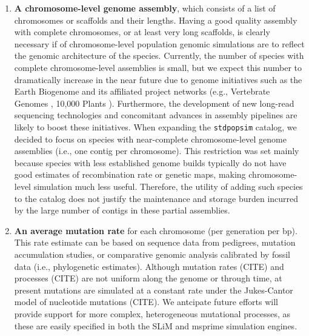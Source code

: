 \documentclass[hidelinks]{article}
\newcommand{\stdpopsim}{\texttt{stdpopsim}\xspace}
\begin{document}
\begin{enumerate}
\def\labelenumi{\arabic{enumi}.}

\item
  \textbf{A chromosome-level genome assembly}, which consists of a list of chromosomes or scaffolds and their lengths. 
  Having a good quality assembly with complete chromosomes, or at least very long scaffolds, 
  is clearly necessary if of chromosome-level population genomic simulations are to reflect the genomic architecture of the species.
  Currently, the number of species with complete chromosome-level assemblies is small,
  but we expect this number to dramatically increase in the near future due to genome initiatives 
  such as the Earth Biogenome \citep{Lewin2022} and its affiliated project networks (e.g.,
  Vertebrate Genomes \citep{Rhie2021}, 10,000 Plants \citep{Cheng2018}).
  Furthermore, the development of new long-read sequencing technologies
  \citep{Amarasinghe2020} and concomitant advances in assembly pipelines
  \citep{Chakraborty2016} are likely to boost these initiatives. 
  When expanding the \stdpopsim catalog, we decided to focus on species with near-complete 
  chromosome-level genome assemblies (i.e., one contig per chromosome).
  This restriction was set mainly because species with less established genome builds 
  typically do not have good estimates of recombination rate or genetic maps, 
  making chromosome-level simulation much less useful. 
  Therefore, the utility of adding such species to the catalog does not justify the 
  maintenance and storage burden incurred by the large number of contigs in these partial assemblies.

\item
  \textbf{An average mutation rate} for each chromosome (per generation per bp).
  This rate estimate can be based on sequence data from pedigrees, mutation accumulation studies, 
  or comparative genomic analysis calibrated by fossil data (i.e., phylogenetic estimates).
  Although mutation rates (CITE) and processes (CITE) are not uniform along the genome or through time,
  at present mutations are simulated at a constant rate under the Jukes-Cantor model of nucleotide mutations (CITE).
  We antcipate future efforts will provide support for more complex, heterogeneous mutational processes,
  as these are easily specified in both the SLiM and msprime simulation engines.


\end{enumerate}
\end{document}
